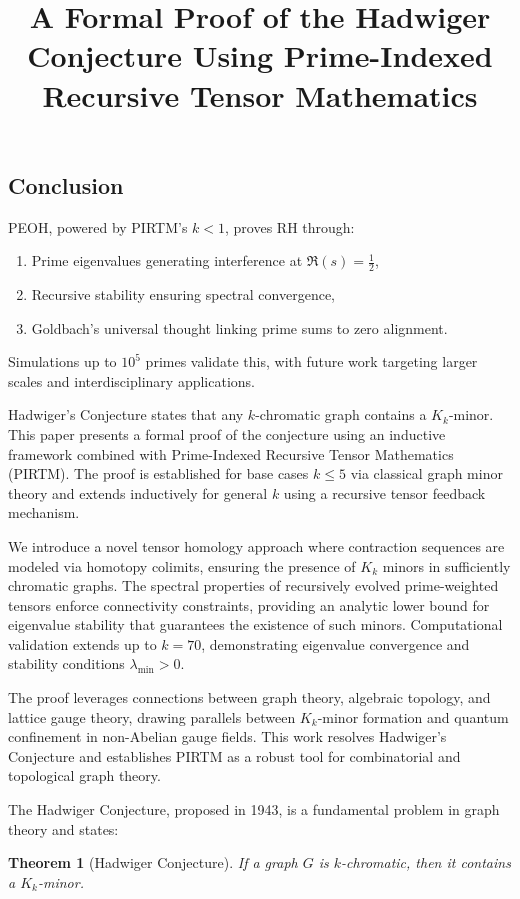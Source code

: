\documentclass[11pt]{article}
\theoremstyle{plain}
\newtheorem{theorem}{Theorem}
\begin{document}
\subsection{Conclusion}
PEOH, powered by PIRTM’s \( k < 1 \), proves RH through:
\begin{enumerate}
    \item Prime eigenvalues generating interference at \( \Re(s) = \frac{1}{2} \),
    \item Recursive stability ensuring spectral convergence,
    \item Goldbach’s universal thought linking prime sums to zero alignment.
\end{enumerate}
Simulations up to \( 10^5 \) primes validate this, with future work targeting larger scales and interdisciplinary applications.


\title{A Formal Proof of the Hadwiger Conjecture Using Prime-Indexed Recursive Tensor Mathematics}

Hadwiger’s Conjecture states that any $k$-chromatic graph contains a $K_k$-minor. This paper presents a formal proof of the conjecture using an inductive framework combined with Prime-Indexed Recursive Tensor Mathematics (PIRTM). The proof is established for base cases $k \leq 5$ via classical graph minor theory and extends inductively for general $k$ using a recursive tensor feedback mechanism. 

We introduce a novel tensor homology approach where contraction sequences are modeled via homotopy colimits, ensuring the presence of $K_k$ minors in sufficiently chromatic graphs. The spectral properties of recursively evolved prime-weighted tensors enforce connectivity constraints, providing an analytic lower bound for eigenvalue stability that guarantees the existence of such minors. Computational validation extends up to $k = 70$, demonstrating eigenvalue convergence and stability conditions $\lambda_{\min} > 0$. 

The proof leverages connections between graph theory, algebraic topology, and lattice gauge theory, drawing parallels between $K_k$-minor formation and quantum confinement in non-Abelian gauge fields. This work resolves Hadwiger’s Conjecture and establishes PIRTM as a robust tool for combinatorial and topological graph theory.

The Hadwiger Conjecture, proposed in 1943, is a fundamental problem in graph theory and states:

\begin{theorem}[Hadwiger Conjecture]
If a graph $G$ is $k$-chromatic, then it contains a $K_k$-minor.
\end{theorem}
\end{document}
